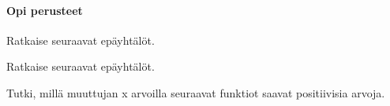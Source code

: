 \begin{tehtavasivu}

\paragraph*{Opi perusteet}

\begin{tehtava}
    Ratkaise seuraavat epäyhtälöt.
    \begin{alakohdat}
    \end{alakohdat}
    \begin{vastaus}
        \begin{alakohdat}
        \end{alakohdat}
    \end{vastaus}
\end{tehtava}

\begin{tehtava}
    Ratkaise seuraavat epäyhtälöt.
    \begin{alakohdat}
    \end{alakohdat}
    \begin{vastaus}
        \begin{alakohdat}
        \end{alakohdat}
    \end{vastaus}
\end{tehtava}

\begin{tehtava}
  Tutki, millä muuttujan x arvoilla seuraavat funktiot saavat positiivisia arvoja.
  \begin{alakohdat}
  \end{alakohdat}


\end{tehtava}
\end{tehtavasivu}
